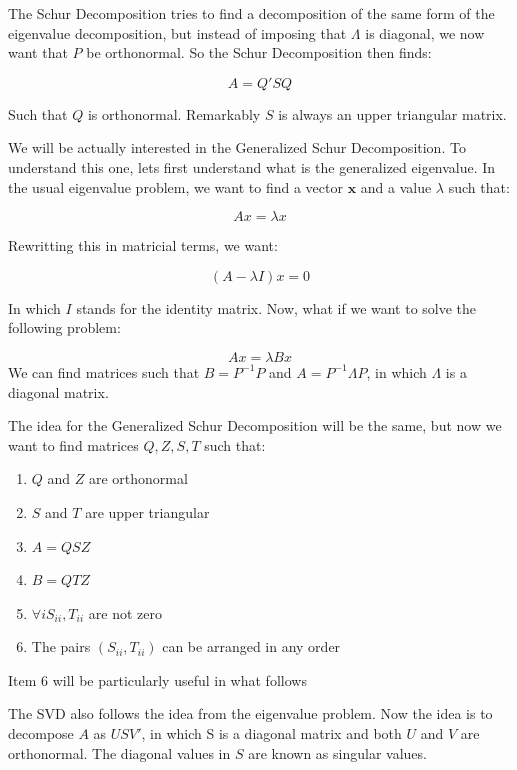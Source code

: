 \documentclass[12pt,a4paper]{article}
\begin{document}
The Schur Decomposition tries to find a decomposition	of the same form of the eigenvalue decomposition, but instead of imposing that $\Lambda$ is diagonal, we now want that $P$ be orthonormal. So the Schur Decomposition then finds:

\[
A = Q'SQ
\]

Such that $Q$ is orthonormal. Remarkably $S$ is always an upper triangular matrix.

We will be actually interested in the Generalized Schur Decomposition. To understand this one, lets first understand what is the generalized eigenvalue. In the usual eigenvalue problem, we want to find a vector $\mathbf{x}$ and a value $\lambda$ such that:

\[
Ax = \lambda x
\]

Rewritting this in matricial terms, we want:

\[
(A - \lambda I)x = 0
\]

In which $I$ stands for the identity matrix. Now, what if we want to solve the following problem:

\[
Ax = \lambda{}Bx
\]
We can find matrices such that $B = P^{-1}P$ and $A = P^{-1}\Lambda{}P$, in which $\Lambda$ is a diagonal matrix.

The idea for the Generalized Schur Decomposition will be the same, but now we want to find matrices $Q,Z,S,T$ such that:

\begin{enumerate}
\item $Q$ and $Z$ are orthonormal

\item $S$ and $T$ are upper triangular

\item $A = QSZ$

\item $B = QTZ$

\item $\forall i S_{ii}, T_{ii}$ are not zero

\item The pairs $(S_{ii}, T_{ii})$ can be arranged in any order

\end{enumerate}
Item 6 will be particularly useful in what follows

The SVD also follows the idea from the eigenvalue problem. Now the idea is to decompose $A$ as $USV'$, in which S is a diagonal matrix and both $U$ and $V$ are orthonormal. The diagonal values in $S$ are known as singular values.
\end{document}
